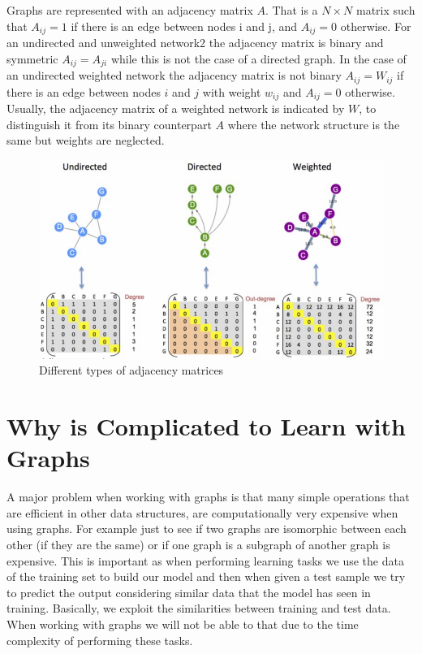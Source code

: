 \newpage

\noindent Graphs are represented with an adjacency matrix $A$. That is a $N \times N$ matrix such that $A_{ij}=1$ if there is an edge between nodes i and j, and $A_{ij} = 0$ otherwise. For an undirected and unweighted network2 the adjacency matrix is binary and symmetric $A_{ij}= A_{ji}$ while this is not the case of a directed graph. In the case of an undirected weighted network the adjacency matrix is not binary $A_{ij}= W_{ij}$ if there is an edge between nodes $i$ and $j$ with weight $w_{ij}$ and $A_{ij}=0$ otherwise. Usually, the adjacency matrix of a weighted network is indicated by $W$, to distinguish it from its binary counterpart $A$ where the network structure is the same but weights are neglected.

\begin{figure}[h]
    \centering
    \includegraphics[width=12cm]{Images/adjacency-matrices.png}
    \caption{Different types of adjacency matrices}
\end{figure}







\section{Why is Complicated to Learn with Graphs}

A major problem when working with graphs is that many simple operations that are efficient in other data structures, are computationally very expensive when using graphs. For example just to see if two graphs are isomorphic between each other (if they are the same) or if one graph is a subgraph of another graph is expensive. This is important as when performing learning tasks we use the data of the training set to build our model and then when given a test sample we try to predict the output considering similar data that the model has seen in training. Basically, we exploit the similarities between training and test data. When working with graphs we will not be able to that due to the time complexity of performing these tasks.

